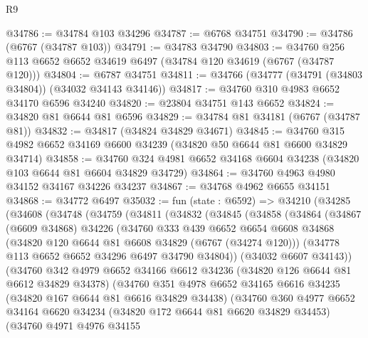 \begin{lexlean}{R9}
\begin{coremodule}
@34786 := @34784 @103 @34296
@34787 := @6768 @34751
@34790 := @34786 (@6767 (@34787 @103))
@34791 := @34783 @34790
@34803 := @34760 @256 @113 @6652 @6652 @34619 @6497 (@34784 @120 @34619 (@6767 (@34787 @120)))
@34804 := @6787 @34751
@34811 := @34766 (@34777 (@34791 (@34803 @34804)) (@34032 @34143 @34146))
@34817 := @34760 @310 @4983 @6652 @34170 @6596 @34240
@34820 := @23804 @34751 @143 @6652
@34824 := @34820 @81 @6644 @81 @6596
@34829 := @34784 @81 @34181 (@6767 (@34787 @81))
@34832 := @34817 (@34824 @34829 @34671)
@34845 := @34760 @315 @4982 @6652 @34169 @6600 @34239 (@34820 @50 @6644 @81 @6600 @34829 @34714)
@34858 := @34760 @324 @4981 @6652 @34168 @6604 @34238 (@34820 @103 @6644 @81 @6604 @34829 @34729)
@34864 := @34760 @4963 @4980 @34152 @34167 @34226 @34237
@34867 := @34768 @4962 @6655 @34151
@34868 := @34772 @6497
@35032 := fun (state : @6592) =>
  @34210
    (@34285
      (@34608
        (@34748
          (@34759
            (@34811
              (@34832
                (@34845
                  (@34858
                    (@34864
                      (@34867
                        (@6609 @34868)
                        @34226
                        (@34760
                          @333
                          @439
                          @6652
                          @6654
                          @6608
                          @34868
                          (@34820 @120 @6644 @81 @6608 @34829 (@6767 (@34274 @120)))
                          (@34778 @113 @6652 @6652 @34296 @6497 @34790 @34804))
                        (@34032 @6607 @34143))
                      (@34760
                        @342
                        @4979
                        @6652
                        @34166
                        @6612
                        @34236
                        (@34820 @126 @6644 @81 @6612 @34829 @34378)
                        (@34760
                          @351
                          @4978
                          @6652
                          @34165
                          @6616
                          @34235
                          (@34820 @167 @6644 @81 @6616 @34829 @34438)
                          (@34760
                            @360
                            @4977
                            @6652
                            @34164
                            @6620
                            @34234
                            (@34820 @172 @6644 @81 @6620 @34829 @34453)
                            (@34760
                              @4971
                              @4976
                              @34155

\end{coremodule}
\end{lexlean}
